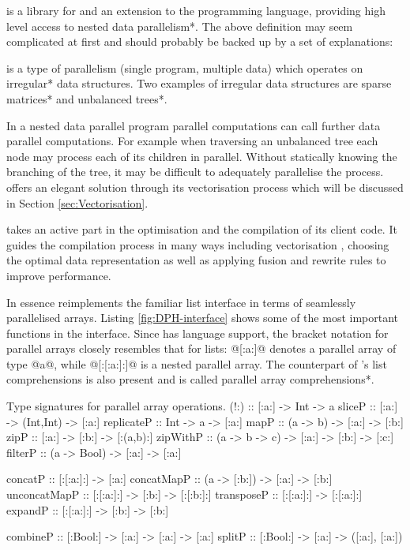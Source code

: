 \documentclass[preamble.tex]{subfiles}
\begin{document}
\idph{} is a library for and an extension to the \Haskell programming language, providing high level access to \*nested data parallelism*. The above definition may seem complicated at first and should probably be backed up by a set of explanations:

 is a type of  parallelism (single program, multiple data) which operates on \*irregular* data structures. Two examples of irregular data structures are \*sparse matrices* and \*unbalanced trees*.

In a nested data parallel program parallel computations can call further data parallel computations. For example when traversing an unbalanced tree each node may process each of its children in parallel. Without statically knowing the branching of the tree, it may be difficult to adequately parallelise the process. \DPH offers an elegant solution through its vectorisation process which will be discussed in Section \ref{sec:Vectorisation}.

\DPH takes an active part in the optimisation and the compilation of its client code. It guides the compilation process in many ways including vectorisation \cite{PLKC08}, choosing the optimal data representation \cite{CDL09} as well as applying fusion \cite{CLP+07} and rewrite rules \cite{PTH01} to improve performance.

In essence \DPH reimplements the familiar list interface in terms of seamlessly parallelised arrays. Listing \ref{fig:DPH-interface} shows some of the most important functions in the \DPH interface. Since \DPH has language support, the bracket notation for parallel arrays closely resembles that for \Haskell lists: @[:a:]@ denotes a parallel array of type @a@, while @[:[:a:]:]@ is a nested parallel array. The counterpart of \Haskell's list comprehensions is also present and is called \*parallel array comprehensions*.


\begin{hscode2}{Type signatures for parallel array operations. \label{fig:DPH-interface}}
(!:)         :: [:a:] -> Int -> a
sliceP       :: [:a:] -> (Int,Int) -> [:a:]
replicateP   :: Int -> a -> [:a:]
mapP         :: (a -> b) -> [:a:] -> [:b:]
zipP         :: [:a:] -> [:b:] -> [:(a,b):]
zipWithP     :: (a -> b -> c) -> [:a:] -> [:b:] -> [:c:]
filterP      :: (a -> Bool) -> [:a:] -> [:a:]

concatP      :: [:[:a:]:] -> [:a:]
concatMapP   :: (a -> [:b:]) -> [:a:] -> [:b:]
unconcatMapP :: [:[:a:]:] -> [:b:] -> [:[:b:]:]
transposeP   :: [:[:a:]:] -> [:[:a:]:]
expandP      :: [:[:a:]:] -> [:b:] -> [:b:]

combineP     :: [:Bool:] -> [:a:] -> [:a:] -> [:a:]
splitP       :: [:Bool:] -> [:a:] -> ([:a:], [:a:])
\end{hscode2}
\end{document}
